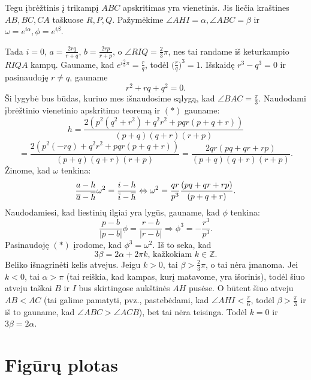 \documentclass[11pt,a4paper,twoside]{book}
\begin{document}
\begin{sprendimas}
Tegu įbrėžtinis į trikampį $ABC$ apskritimas yra vienetinis. Jis liečia kraštines $AB, BC, CA$ taškuose $R, P, Q$. Pažymėkime $\angle AHI = \alpha, \angle ABC = \beta$ ir $\omega = e^{i\alpha}, \phi = e^{i\beta}$.

Tada $i=0$, $a=\frac{2rq}{r+q}$, $b=\frac{2rp}{r+p}$, o $\angle RIQ=\frac{2}{3}\pi$, nes tai randame iš keturkampio $RIQA$ kampų. Gauname, kad $e^{i\frac{2}{3}\pi}=\frac{r}{q}$, todėl $\Big(\frac{r}{q}\Big)^3=1$. Išskaidę $r^3-q^3=0$ ir pasinaudoję $r\ne q$, gauname
\begin{equation}
r^2 + rq + q^2 = 0. \tag{$*$}
\end{equation}
Ši lygybė bus būdas, kuriuo mes išnaudosime sąlygą, kad $\angle BAC = \frac{\pi}{3}$.
Naudodami įbrėžtinio vienetinio apskritimo teoremą ir $(*)$ gauname:
$$h=\frac{2(p^2(q^2 + r^2) + q^2r^2  + pqr(p + q+ r))}{(p+q)(q+r)(r+p)}$$
$$=\frac{2(p^2(-rq) + q^2r^2  + pqr(p + q+ r))}{(p+q)(q+r)(r+p)}=\frac{2qr(pq +qr+rp)}{(p+q)(q+r)(r+p)}.$$
Žinome, kad $\omega$ tenkina:
$$\frac{a-h}{\overline{a}-\overline{h}}\omega^2=\frac{i-h}{\overline{i}-\overline{h}} \Leftrightarrow \omega^2=\frac{qr}{p^3}\frac{(pq +qr+rp)}{(p+q+r)}.$$
Naudodamiesi, kad liestinių ilgiai yra lygūs, gauname, kad $\phi$ tenkina:
$$\frac{p-b}{|p-b|}\phi=\frac{r-b}{|r-b|} \Rightarrow \phi^3=-\frac{r^3}{p^3}.$$
Pasinaudoję $(*)$ įrodome, kad $\phi^3=\omega^2.$ Iš to seka, kad
$$3\beta=2\alpha + 2\pi k \text{, kažkokiam } k\in\mathbb{Z}.$$
Beliko išnagrinėti kelis atvejus. Jeigu $k>0$, tai $\beta>\frac{2}{3}\pi$, o tai nėra įmanoma. Jei $k<0$, tai $\alpha > \pi$ (tai reiškia, kad kampas, kurį matavome, yra išorinis), todėl šiuo atveju taškai $B$ ir $I$ bus skirtingose aukštinės $AH$ pusėse. O būtent šiuo atveju $AB<AC$ (tai galime pamatyti, pvz., pastebėdami, kad $\angle AHI < \frac{\pi}{6}$, todėl $\beta > \frac{\pi}{3}$ ir iš to gauname, kad $\angle ABC > \angle ACB$), bet tai nėra teisinga. Todėl $k=0$ ir $3\beta=2\alpha$.
\end{sprendimas}



















\section{Figūrų plotas}
\end{document}
